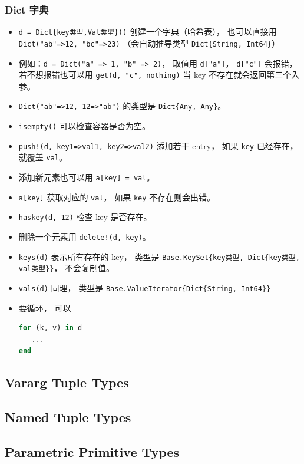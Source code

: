 \subsubsection{Dict 字典}
\begin{itemize}
\item \verb`d = Dict{key类型,Val类型}()` 创建一个字典（哈希表）， 也可以直接用 \verb`Dict("ab"=>12, "bc"=>23)` （会自动推导类型 \verb`Dict{String, Int64}`）
\item 例如：\verb`d = Dict("a" => 1, "b" => 2)`， 取值用 \verb`d["a"]`， \verb`d["c"]` 会报错， 若不想报错也可以用 \verb`get(d, "c", nothing)` 当 key 不存在就会返回第三个入参。
\item \verb`Dict("ab"=>12, 12=>"ab")` 的类型是 \verb`Dict{Any, Any}`。
\item \verb`isempty()` 可以检查容器是否为空。
\item \verb`push!(d, key1=>val1, key2=>val2)` 添加若干 entry， 如果 \verb`key` 已经存在， 就覆盖 \verb`val`。
\item 添加新元素也可以用 \verb`a[key] = val`。
\item \verb`a[key]` 获取对应的 \verb`val`， 如果 \verb`key` 不存在则会出错。
\item \verb`haskey(d, 12)` 检查 key 是否存在。
\item 删除一个元素用 \verb`delete!(d, key)`。
\item \verb`keys(d)` 表示所有存在的 key， 类型是 \verb`Base.KeySet{key类型, Dict{key类型, val类型}}`， 不会复制值。
\item \verb`vals(d)` 同理， 类型是 \verb`Base.ValueIterator{Dict{String, Int64}}`
\item 要循环， 可以
\begin{lstlisting}[language=julia]
for (k, v) in d
   ...
end
\end{lstlisting}
\end{itemize}


\subsection{Vararg Tuple Types}

\subsection{Named Tuple Types}

\subsection{Parametric Primitive Types}

